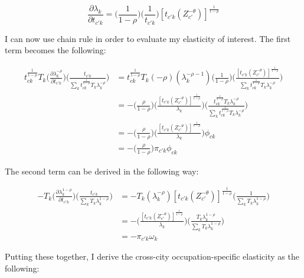 \documentclass[10pt]{article}
\begin{document}
\begin{equation*}
    \frac{\partial{\lambda_{k}}}{\partial{t_{{c'}k}}} = \Big(\frac{1}{1-\rho}\Big)\Big(\frac{1}{t_{{c'}k}}\Big)[{t_{{c'}k}}(Z_{c'}^{-\theta})]^{\frac{1}{1-\rho}}
\end{equation*}

I can now use chain rule in order to evaluate my elasticity of interest. The first term becomes the following:

\begin{align*}
    {t^{\frac{1}{1-\rho}}_{ck}}{T_{k}}\Big(\frac{\partial\lambda_{k}^{-\rho}}{\partial{t_{{c'}k}}}\Big)\Big(\frac{t_{{c'}k}}{{\sum\limits_{k}{t^{\frac{1}{1-\rho}}_{ck}}{T_{k}}\lambda_{k}^{-\rho}}}\Big) & = {t^{\frac{1}{1-\rho}}_{ck}}{T_{k}}(-\rho)(\lambda_{k}^{-\rho-1})\Big(\frac{1}{1-\rho}\Big)\Bigg(\frac{[{t_{{c'}k}}(Z_{c'}^{-\theta})]^{\frac{1}{1-\rho}}}{{\sum\limits_{k}{t^{\frac{1}{1-\rho}}_{ck}}{T_{k}}\lambda_{k}^{-\rho}}}\Bigg) \\ &= -\Bigg(\frac{\rho}{1-\rho}\Bigg)\Bigg(\frac{[{t_{{c'}k}}(Z_{c'}^{-\theta})]^{\frac{1}{1-\rho}}}{\lambda_{k}}\Bigg)\Bigg(\frac{t^{\frac{1}{1-\rho}}_{ck}{T_{k}}{\lambda^{-\rho}_{k}}}{{\sum\limits_{k}{t^{\frac{1}{1-\rho}}_{ck}}{T_{k}}\lambda_{k}^{-\rho}}}\Bigg)\\ &= -\Bigg(\frac{\rho}{1-\rho}\Bigg)\Bigg(\frac{[{t_{{c'}k}}(Z_{c'}^{-\theta})]^{\frac{1}{1-\rho}}}{\lambda_{k}}\Bigg){\phi_{ck}}\\ &= -\Big(\frac{\rho}{1-\rho}\Big){\pi_{{c'}k}}{\phi_{ck}}
\end{align*}

The second term can be derived in the following way:

\begin{align*}
    - {T_{k}}\Big(\frac{\partial\lambda_{k}^{1-\rho}}{\partial{t_{{c'}k}}}\Big)\Big(\frac{t_{{c'}k}}{{\sum\limits_{k}{T_{k}}\lambda_{k}^{1-\rho}}}\Big) & = - {T_{k}}(\lambda_{k}^{-\rho})[{t_{{c'}k}}(Z_{c'}^{-\theta})]^{\frac{1}{1-\rho}}\Big(\frac{1}{{\sum\limits_{k}{T_{k}}\lambda_{k}^{1-\rho}}}\Big) \\ &= - \Bigg(\frac{[{t_{{c'}k}}(Z_{c'}^{-\theta})]^{\frac{1}{1-\rho}}}{\lambda_{k}}\Bigg)\Big(\frac{{T_{k}}{\lambda_{k}^{1-\rho}}}{{\sum\limits_{k} T_k \lambda_{k}^{1-\rho}}}\Big)\\ &= -\pi_{{c'}k}{\omega_{k}}
\end{align*}

Putting these together, I derive the cross-city occupation-specific elasticity as the following:
\end{document}

